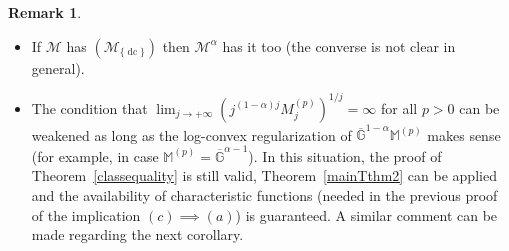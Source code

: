 \documentclass[11pt,a4paper]{article}
\theoremstyle{plain}
\theoremstyle{definition}
\newtheorem{remark}[proposition]{Remark}
\newcommand{\M}{\mathbb{M}}
\newcommand{\G}{\mathbb{G}}
\let\on=\operatorname
\begin{document}
\begin{remark}\label{ramimatrixdc}
\begin{itemize}
\item[(i)] If $\mathcal{M}$ has \hyperlink{R-dc}{$(\mathcal{M}_{\{\on{dc}\}})$} then $\mathcal{M}^\alpha$ has it too (the converse is not clear in general).
\item[(ii)] The condition that $\lim_{j\rightarrow+\infty}(j^{(1-\alpha)j}M^{(p)}_j)^{1/j}=\infty$ for all $p>0$ can be weakened as long as the log-convex regularization of $\overline{\G}^{1-\alpha}\M^{(p)}$ makes sense (for example, in case $\M^{(p)}=\overline{\G}^{\alpha-1}$). In this situation, the proof of Theorem~\ref{classequality} is still valid, Theorem~\ref{mainTthm2} can be applied and the availability of characteristic functions (needed in the previous proof of the implication $(c)\implies(a)$) is guaranteed. A similar comment can be made regarding the next corollary.
\end{itemize}
%	
\end{remark}

%
%
%
\end{document}
